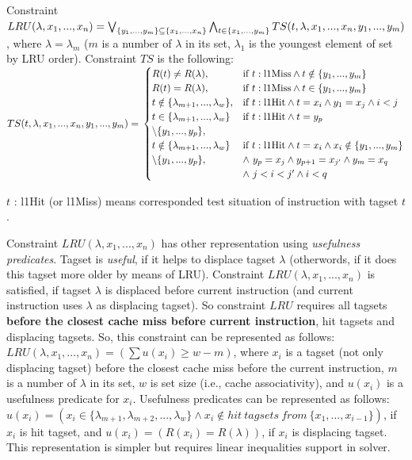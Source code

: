 \documentclass[times, 10pt,twocolumn]{article}
\begin{document}
Constraint $LRU(\lambda, x_1, ..., x_n) = \bigvee_{\{y_1, ..., y_m\} \subseteq \{x_1, ..., x_n\}} \bigwedge_{t \in \{x_1, ..., y_m\}}  TS(t, \lambda, x_1, ..., x_n,\\y_1, ..., y_m)$, where $\lambda = \lambda_m$ ($m$ is a number of $\lambda$ in its set, $\lambda_1$ is the youngest element of set by LRU order). Constraint $TS$ is the following:\\
$TS(t, \lambda, x_1, ..., x_n, y_1, ..., y_m) = \\
\begin{cases}
R(t) \neq R(\lambda),&\text{if~} t:\text{l1Miss} \wedge t \notin \{y_1, ..., y_m\}\\
R(t) = R(\lambda),&\text{if~} t:\text{l1Miss} \wedge t \in \{y_1, ..., y_m\}\\
t \notin \{\lambda_{m+1}, ..., \lambda_w\},&\text{if~} t:\text{l1Hit} \wedge t = x_i \wedge y_1 = x_j \wedge i < j\\
t \in \{\lambda_{m+1}, ..., \lambda_w\}&\text{if~} t:\text{l1Hit} \wedge t = y_p\\ \setminus\{y_1, ..., y_p\},\\
t \notin \{\lambda_{m+1}, ..., \lambda_w\}&\text{if~} t:\text{l1Hit} \wedge t = x_i \wedge x_i \notin \{y_1, ..., y_m\}\\ \setminus\{y_1, ..., y_p\},& \wedge~y_p = x_j \wedge y_{p+1} = x_{j'} \wedge y_m = x_q\\& \wedge~j < i < j' \wedge i < q \\
\end{cases}$

$t$ : l1Hit (or l1Miss) means corresponded test situation of instruction with tagset $t$.

Constraint $LRU(\lambda, x_1, ..., x_n)$ has other representation using \emph{usefulness predicates}. Tagset is \emph{useful}, if it helps to displace tagset $\lambda$ (otherwords, if it does this tagset more older by means of LRU). Constraint $LRU(\lambda, x_1, ..., x_n)$ is satisfied, if tagset $\lambda$ is displaced before current instruction (and current instruction uses $\lambda$ as displacing tagset). So constraint $LRU$ requires all tagsets \textbf{before the closest cache miss before current instruction}, hit tagsets and displacing tagsets. So, this constraint can be represented as follows:
$LRU(\lambda, x_1, ..., x_n) = (\sum u(x_i) \geqslant w-m)$, where $x_i$ is a tagset (not only displacing tagset) before the closest cache miss before the current instruction, $m$ is a number of $\lambda$ in its set, $w$ is set size (i.e., cache associativity), and $u(x_i)$ is a usefulness predicate for $x_i$. Usefulness predicates can be represented as follows: $u(x_i) = (x_i \in \{ \lambda_{m+1}, \lambda_{m+2}, ..., \lambda_w \} \wedge x_i \notin hit~tagsets~from~\{x_1, ..., x_{i-1} \})$, if $x_i$ is hit tagset, and $u(x_i) = (R(x_i) = R(\lambda))$, if $x_i$ is displacing tagset. This representation is simpler but requires linear inequalities support in solver.
\end{document}
